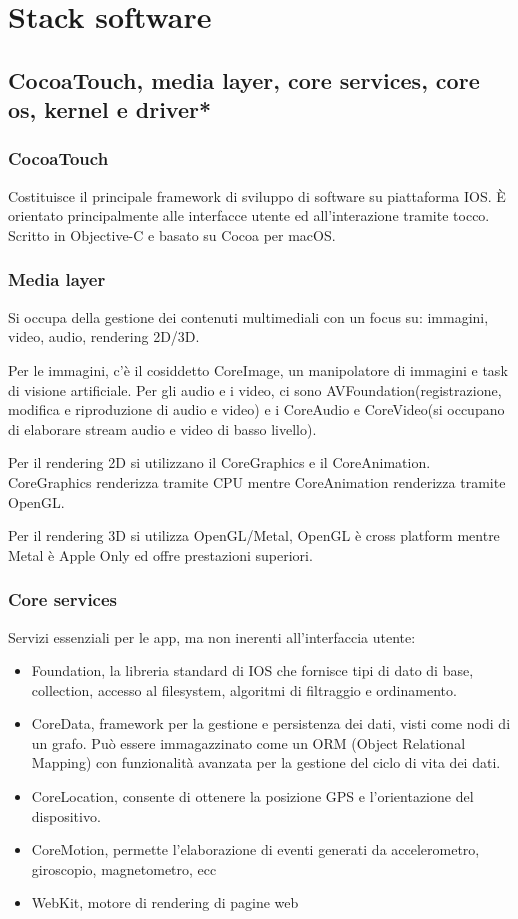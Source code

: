 \documentclass{report}
\begin{document}
\section{Stack software}
\subsection{CocoaTouch, media layer, core services, core os, kernel e driver*}
\subsubsection*{CocoaTouch}
Costituisce il principale framework di sviluppo di software su piattaforma IOS. È orientato principalmente alle interfacce utente ed all’interazione tramite tocco. Scritto in Objective-C e basato su Cocoa per macOS.
\subsubsection{Media layer}
Si occupa della gestione dei contenuti multimediali con un focus su: immagini, video, audio, rendering 2D/3D.

Per le immagini, c’è il cosiddetto CoreImage, un manipolatore di immagini e task di visione artificiale.
Per gli audio e i video, ci sono AVFoundation(registrazione, modifica e riproduzione di audio e video) e i CoreAudio e CoreVideo(si occupano di elaborare stream audio e video di basso livello).

Per il rendering 2D si utilizzano il CoreGraphics e il CoreAnimation. CoreGraphics renderizza
tramite CPU mentre CoreAnimation renderizza tramite OpenGL.

Per il rendering 3D si utilizza OpenGL/Metal, OpenGL è cross platform mentre Metal è Apple Only ed
offre prestazioni superiori.
\subsubsection*{Core services}
Servizi essenziali per le app, ma non inerenti all’interfaccia utente:
\begin{itemize}
    \item Foundation, la libreria standard di IOS che fornisce tipi di dato di base, collection, accesso al
filesystem, algoritmi di filtraggio e ordinamento.
    \item CoreData, framework per la gestione e persistenza dei dati, visti come nodi di un grafo. Può
essere immagazzinato come un ORM (Object Relational Mapping) con funzionalità avanzata
per la gestione del ciclo di vita dei dati.
    \item CoreLocation, consente di ottenere la posizione GPS e l’orientazione del dispositivo.
    \item CoreMotion, permette l’elaborazione di eventi generati da accelerometro, giroscopio,
magnetometro, ecc
    \item WebKit, motore di rendering di pagine web
\end{itemize}
\end{document}
